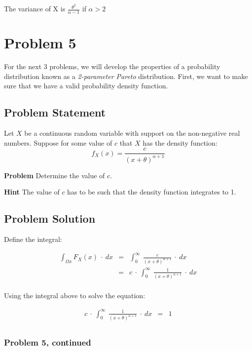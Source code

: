 \documentclass[12pt]{article}
\theoremstyle{definition}
\begin{document}
The variance of X is $\frac{\theta^2}{\alpha - 1}$ if $ \alpha > 2 $

\newpage
\section*{Problem 5}

For the next 3 problems, we will develop the properties of a probability distribution known as a {\em 2-parameter Pareto} distribution. First, we want to make sure that we have a valid probability density function.


\subsection*{Problem Statement}

Let $X$ be a continuous random variable with support on the non-negative real numbers. Suppose for some value of $c$ that $X$ has the density function:
$$
f_X(x) = \frac{c}{(x + \theta)^{\alpha + 1}}
$$

\bigskip
\noindent
{\bf Problem} Determine the value of $c$.

\bigskip
\noindent
{\bf Hint} The value of $c$ has to be such that the density function integrates to 1.


\subsection*{Problem Solution}

Define the integral:

\begin{eqnarray*}
\int_{\Omega x} F_X(x) \ \cdot \ dx & = &  \int_0^\infty \ \frac{c}{(x+\theta)^{\alpha +1}} \ \cdot \ dx \\
& = & c \ \cdot \ \int_0^\infty \ \frac{1}{(x+\theta)^{\alpha +1}} \ \cdot \ dx \\
\end{eqnarray*}

Using the integral above to solve the equation:

\begin{eqnarray*}
c \ \cdot \ \int_0^\infty \ \frac{1}{(x+\theta)^{\alpha +1}} \ \cdot \ dx & = &  1\\
\end{eqnarray*}

\newpage
\subsubsection*{Problem 5, continued}
\end{document}
